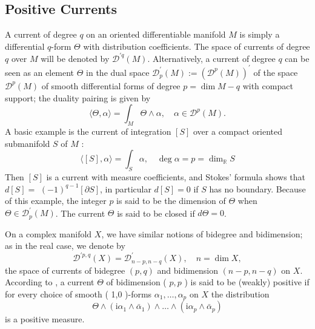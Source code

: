 \subsection{Positive Currents}
A current of degree $q$ on an oriented differentiable manifold $M$ is simply a differential $q$-form $\Theta$ with distribution coefficients. The space of currents of degree $q$ over $M$ will be denoted by $\mathscr{D}^{\prime q}(M)$. Alternatively, a current of degree $q$ can be seen as an element $\Theta$ in the dual space $\mathscr{D}_p^{\prime}(M):=\left(\mathscr{D}^p(M)\right)^{\prime}$ of the space $\mathscr{D}^p(M)$ of smooth differential forms of degree $p=\operatorname{dim} M-q$ with compact support; the duality pairing is given by
\begin{equation}\label{eq:2.1}
    \langle\Theta, \alpha\rangle=\int_M \Theta \wedge \alpha, \quad \alpha \in \mathscr{D}^p(M) .
\end{equation}
A basic example is the current of integration $[S]$ over a compact oriented submanifold $S$ of $M$ :
\begin{equation}\label{eq:2.2}
    \langle[S], \alpha\rangle=\int_S \alpha, \quad \operatorname{deg} \alpha=p=\operatorname{dim}_{\mathbb{R}} S
\end{equation}
Then $[S]$ is a current with measure coefficients, and Stokes' formula shows that $d[S]=$ $(-1)^{q-1}[\partial S]$, in particular $d[S]=0$ if $S$ has no boundary. Because of this example, the integer $p$ is said to be the dimension of $\Theta$ when $\Theta \in \mathscr{D}_p^{\prime}(M)$. The current $\Theta$ is said to be closed if $d \Theta=0$.

On a complex manifold $X$, we have similar notions of bidegree and bidimension; as in the real case, we denote by
\begin{equation}\label{eq:2.3}
    \mathscr{D}^{\prime p, q}(X)=\mathscr{D}_{n-p, n-q}^{\prime}(X), \quad n=\operatorname{dim} X,
\end{equation}
the space of currents of bidegree $(p, q)$ and bidimension $(n-p, n-q)$ on $X$. According to \cite{lelong1957integration}, a current $\Theta$ of bidimension ( $p, p$ ) is said to be (weakly) positive if for every choice of smooth ( 1,0 )-forms $\alpha_1, \ldots, \alpha_p$ on $X$ the distribution
$$\Theta \wedge (\mathrm{i} \alpha_1 \wedge \bar{\alpha}_1) \wedge \ldots \wedge (\mathrm{i} \alpha_p \wedge \bar{\alpha}_p) $$ is a positive measure.

